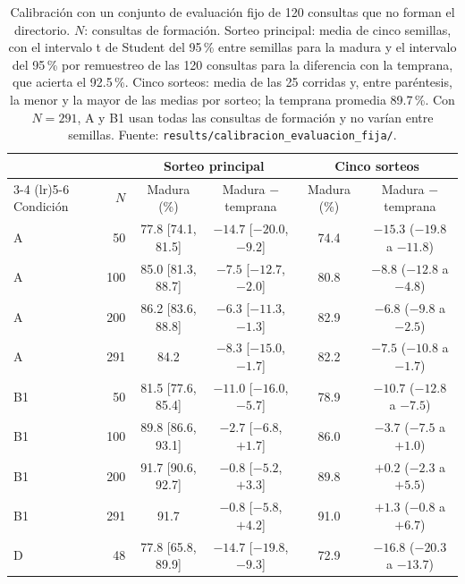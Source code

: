 \begin{table}[H]
    \centering
    \caption[Calibración con un conjunto de evaluación fijo]{Calibración con un conjunto de evaluación fijo de 120 consultas que no
    forman el directorio. $N$: consultas de formación. Sorteo principal: media de cinco
    semillas, con el intervalo t de Student del 95\,\% entre semillas para la madura y el
    intervalo del 95\,\% por remuestreo de las 120 consultas para la diferencia con la
    temprana, que acierta el 92.5\,\%. Cinco sorteos: media de las 25 corridas y, entre
    paréntesis, la menor y la mayor de las medias por sorteo; la temprana promedia
    89.7\,\%. Con $N = 291$, A y B1 usan todas las consultas de formación y no varían
    entre semillas. Fuente: \texttt{results/calibracion\_evaluacion\_fija/}.}
    \label{tab:calibracion-fija}
    \small
    \setlength{\tabcolsep}{4pt}
    \begin{tabular}{lrcccc}
        \toprule
        & & \multicolumn{2}{c}{Sorteo principal} & \multicolumn{2}{c}{Cinco sorteos} \\
        \cmidrule(lr){3-4} \cmidrule(lr){5-6}
        Condición & $N$ & Madura (\%) & Madura $-$ temprana & Madura (\%) & Madura $-$ temprana \\
        \midrule
        A  &  50 & 77.8 [74.1, 81.5] & $-14.7$ [$-20.0$, $-9.2$]  & 74.4 & $-15.3$ ($-19.8$ a $-11.8$) \\
        A  & 100 & 85.0 [81.3, 88.7] & $-7.5$ [$-12.7$, $-2.0$]   & 80.8 & $-8.8$ ($-12.8$ a $-4.8$) \\
        A  & 200 & 86.2 [83.6, 88.8] & $-6.3$ [$-11.3$, $-1.3$]   & 82.9 & $-6.8$ ($-9.8$ a $-2.5$) \\
        A  & 291 & 84.2              & $-8.3$ [$-15.0$, $-1.7$]   & 82.2 & $-7.5$ ($-10.8$ a $-1.7$) \\
        \midrule
        B1 &  50 & 81.5 [77.6, 85.4] & $-11.0$ [$-16.0$, $-5.7$]  & 78.9 & $-10.7$ ($-12.8$ a $-7.5$) \\
        B1 & 100 & 89.8 [86.6, 93.1] & $-2.7$ [$-6.8$, $+1.7$]    & 86.0 & $-3.7$ ($-7.5$ a $+1.0$) \\
        B1 & 200 & 91.7 [90.6, 92.7] & $-0.8$ [$-5.2$, $+3.3$]    & 89.8 & $+0.2$ ($-2.3$ a $+5.5$) \\
        B1 & 291 & 91.7              & $-0.8$ [$-5.8$, $+4.2$]    & 91.0 & $+1.3$ ($-0.8$ a $+6.7$) \\
        \midrule
        D  &  48 & 77.8 [65.8, 89.9] & $-14.7$ [$-19.8$, $-9.3$]  & 72.9 & $-16.8$ ($-20.3$ a $-13.7$) \\

\end{tabular}
\end{table}

